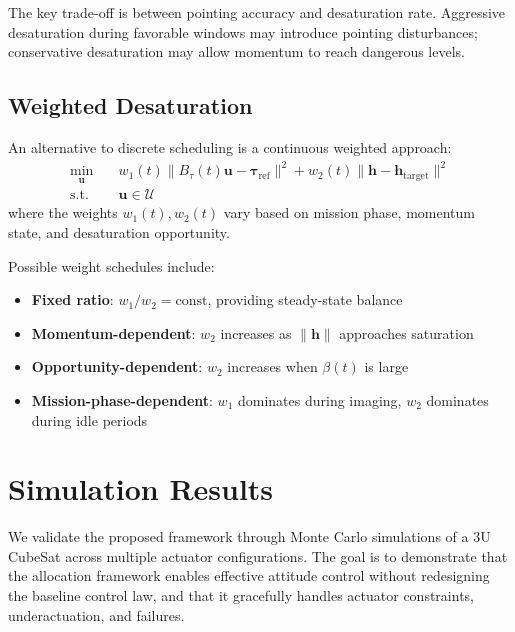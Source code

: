 \documentclass[conference]{IEEEtran}
\begin{document}
The key trade-off is between pointing accuracy and desaturation rate. Aggressive desaturation during favorable windows may introduce pointing disturbances; conservative desaturation may allow momentum to reach dangerous levels.

\subsection{Weighted Desaturation}
An alternative to discrete scheduling is a continuous weighted approach:
\begin{equation}
\begin{aligned}
\min_{\mathbf{u}} \quad & w_1(t) \|B_\tau(t) \mathbf{u} - \boldsymbol{\tau}_{\text{ref}}\|^2 + w_2(t) \|\mathbf{h} - \mathbf{h}_{\text{target}}\|^2 \\
\text{s.t.} \quad & \mathbf{u} \in \mathcal{U}
\end{aligned}
\end{equation}
where the weights $w_1(t), w_2(t)$ vary based on mission phase, momentum state, and desaturation opportunity.

Possible weight schedules include:
\begin{itemize}
    \item \textbf{Fixed ratio}: $w_1/w_2 = \text{const}$, providing steady-state balance
    \item \textbf{Momentum-dependent}: $w_2$ increases as $\|\mathbf{h}\|$ approaches saturation
    \item \textbf{Opportunity-dependent}: $w_2$ increases when $\beta(t)$ is large
    \item \textbf{Mission-phase-dependent}: $w_1$ dominates during imaging, $w_2$ dominates during idle periods
\end{itemize}

\section{Simulation Results}\label{sec:results}

We validate the proposed framework through Monte Carlo simulations of a 3U CubeSat across multiple actuator configurations. The goal is to demonstrate that the allocation framework enables effective attitude control without redesigning the baseline control law, and that it gracefully handles actuator constraints, underactuation, and failures.
\end{document}
